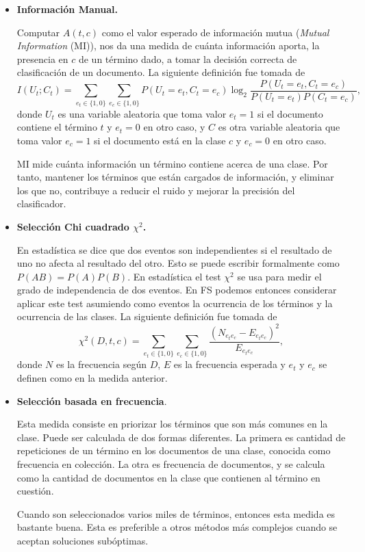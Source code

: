 \documentclass{llncs}
\begin{document}
		\begin{itemize}
			\item\textbf{Informaci\'on Manual.}
			\smallskip
			
				Computar $A(t,c)$ como el valor esperado de informaci\'on mutua (\emph{Mutual Information} (MI)), nos da una medida de cu\'anta informaci\'on aporta, la presencia en $c$ de un t\'ermino dado, a tomar la decisi\'on correcta de clasificaci\'on de un documento. La siguiente definici\'on fue tomada de \cite[Ecuaci\'on 13.16]{B1}
				\[
					I(U_t;C_t) = \sum_{e_t \in \{ 1,0 \} } \sum_{e_c \in \{ 1,0 \} } P( U_t = e_t, C_t = e_c) \log_2 \frac{P (U_t = e_t, C_t = e_c) }{ P(U_t = e_t) P(C_t = e_c) },
				\]
				donde $U_t$ es una variable aleatoria que toma valor $e_t = 1$ si el documento contiene el t\'ermino $t$ y $e_t = 0$ en otro caso, y $C$ es otra variable aleatoria que toma valor $e_c = 1$ si el documento est\'a en la clase $c$ y $e_c = 0  $ en otro caso. 
				
				\smallskip
	
				MI mide cu\'anta informaci\'on un t\'ermino contiene acerca de una clase. Por tanto, mantener los t\'erminos que est\'an cargados de informaci\'on, y eliminar los que no, contribuye a reducir el ruido y mejorar la precisi\'on del clasificador.
	
			\smallskip
			\item\textbf{Selecci\'on Chi cuadrado $\chi^2$.} 
			\smallskip
			
			En estad\'istica se dice que dos eventos son independientes si el resultado de uno no afecta al resultado del otro. Esto se puede escribir formalmente como $P(AB) = P(A) P(B)$. En estad\'istica el test $\chi^2$ se usa para medir el grado de independencia de dos eventos. En FS podemos entonces considerar aplicar este test asumiendo como eventos la ocurrencia de los t\'erminos y la ocurrencia de las clases.  La siguiente definici\'on fue tomada de \cite[Ecuaci\'on 13.18]{B1}
			\[
				\chi^2(D,t,c) = \sum_{e_t\in \{ 1, 0 \}} \sum_{e_c\in \{ 1, 0 \}} \frac{(N_{e_te_c} - E_{e_t e_c}) ^2 } { E_{e_t e_c}},
			\]
			donde $N$ es la frecuencia seg\'un $D$, $E$ es la frecuencia esperada y $e_t$ y  $e_c$ se definen como en la medida anterior.
			
			\smallskip
			\item \textbf{Selecci\'on basada en frecuencia}.
			\smallskip
			
			 Esta medida consiste en priorizar los t\'erminos que son m\'as comunes en la  clase. Puede ser calculada de dos formas diferentes. La primera es cantidad de repeticiones de un t\'ermino en los documentos de una clase, conocida como frecuencia en colecci\'on. La otra es frecuencia de documentos, y se calcula como la cantidad de documentos en la clase que contienen al t\'ermino en cuesti\'on.
			
			\smallskip
				
			Cuando son seleccionados varios miles de t\'erminos, entonces esta medida es bastante buena. Esta es preferible a otros m\'etodos m\'as complejos cuando se aceptan soluciones sub\'optimas.
			
		\end{itemize}
	
\end{document}
